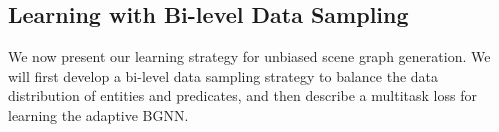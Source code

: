 
\subsection{Learning with Bi-level Data Sampling}\label{subsec:learning}

We now present our learning strategy for unbiased scene graph generation. We will first develop a bi-level data sampling strategy to balance the data distribution of entities and predicates, and then describe a multitask loss for learning the adaptive BGNN. 


